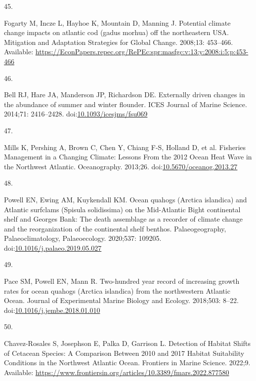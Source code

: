 \documentclass[
  10pt,
]{article}
\newlength{\cslhangindent}
\newlength{\csllabelwidth}
\newlength{\cslentryspacingunit} %
\newenvironment{CSLReferences}[2] %
 {%
  \setlength{\parindent}{0pt}
  \ifodd #1
  \let\oldpar\par
  \def\par{\hangindent=\cslhangindent\oldpar}
  \fi
  \setlength{\parskip}{#2\cslentryspacingunit}
 }%
 {}
\newcommand{\CSLLeftMargin}[1]{\parbox[t]{\csllabelwidth}{#1}}
\newcommand{\CSLRightInline}[1]{\parbox[t]{\linewidth - \csllabelwidth}{#1}\break}
\begin{document}
\begin{CSLReferences}{0}{0}
\leavevmode{}%
\CSLLeftMargin{45. }%
\CSLRightInline{Fogarty M, Incze L, Hayhoe K, Mountain D, Manning J. Potential climate change impacts on atlantic cod (gadus morhua) off the northeastern USA. Mitigation and Adaptation Strategies for Global Change. 2008;13: 453--466. Available: \url{https://EconPapers.repec.org/RePEc:spr:masfgc:v:13:y:2008:i:5:p:453-466}}

\leavevmode{}%
\CSLLeftMargin{46. }%
\CSLRightInline{Bell RJ, Hare JA, Manderson JP, Richardson DE. {Externally driven changes in the abundance of summer and winter flounder}. ICES Journal of Marine Science. 2014;71: 2416--2428. doi:\href{https://doi.org/10.1093/icesjms/fsu069}{10.1093/icesjms/fsu069}}

\leavevmode{}%
\CSLLeftMargin{47. }%
\CSLRightInline{Mills K, Pershing A, Brown C, Chen Y, Chiang F-S, Holland D, et al. Fisheries {Management} in a {Changing} {Climate}: {Lessons} {From} the 2012 {Ocean} {Heat} {Wave} in the {Northwest} {Atlantic}. Oceanography. 2013;26. doi:\href{https://doi.org/10.5670/oceanog.2013.27}{10.5670/oceanog.2013.27}}

\leavevmode{}%
\CSLLeftMargin{48. }%
\CSLRightInline{Powell EN, Ewing AM, Kuykendall KM. Ocean quahogs ({Arctica} islandica) and {Atlantic} surfclams ({Spisula} solidissima) on the {Mid}-{Atlantic} {Bight} continental shelf and {Georges} {Bank}: {The} death assemblage as a recorder of climate change and the reorganization of the continental shelf benthos. Palaeogeography, Palaeoclimatology, Palaeoecology. 2020;537: 109205. doi:\href{https://doi.org/10.1016/j.palaeo.2019.05.027}{10.1016/j.palaeo.2019.05.027}}

\leavevmode{}%
\CSLLeftMargin{49. }%
\CSLRightInline{Pace SM, Powell EN, Mann R. Two-hundred year record of increasing growth rates for ocean quahogs ({Arctica} islandica) from the northwestern {Atlantic} {Ocean}. Journal of Experimental Marine Biology and Ecology. 2018;503: 8--22. doi:\href{https://doi.org/10.1016/j.jembe.2018.01.010}{10.1016/j.jembe.2018.01.010}}

\leavevmode{}%
\CSLLeftMargin{50. }%
\CSLRightInline{Chavez-Rosales S, Josephson E, Palka D, Garrison L. Detection of {Habitat} {Shifts} of {Cetacean} {Species}: {A} {Comparison} {Between} 2010 and 2017 {Habitat} {Suitability} {Conditions} in the {Northwest} {Atlantic} {Ocean}. Frontiers in Marine Science. 2022;9. Available: \url{https://www.frontiersin.org/articles/10.3389/fmars.2022.877580}}


\end{CSLReferences}
\end{document}
